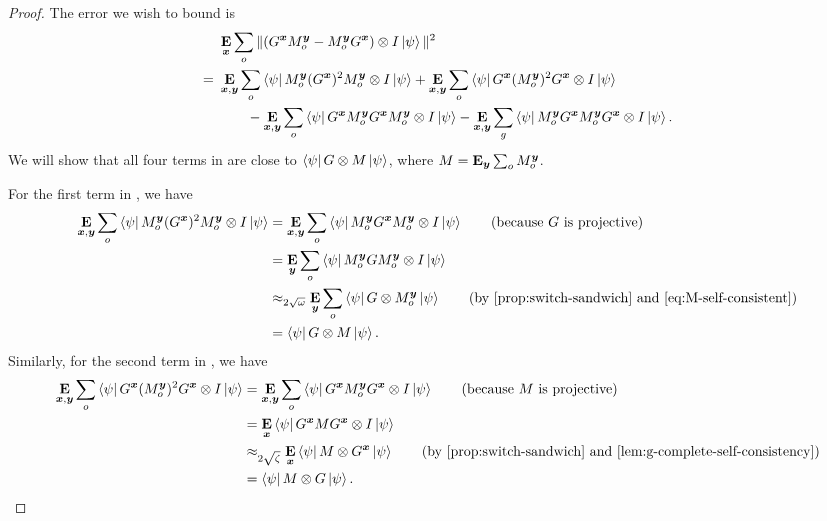 \begin{proof}
The error we wish to bound is
\begin{align}
&\mathop{\bf E\/}_{{\boldsymbol{x}}} \sum_o \Vert (G^{{\boldsymbol{x}}} M^{\boldsymbol{y}}_o - M^{\boldsymbol{y}}_o G^{{\boldsymbol{x}}}) \otimes I \ket{\psi}\Vert^2\nonumber\\
=~&\mathop{\bf E\/}_{{\boldsymbol{x}}, \boldsymbol{y}} \sum_o \bra{\psi} M^{\boldsymbol{y}}_o (G^{{\boldsymbol{x}}})^2 M^{\boldsymbol{y}}_o \otimes I \ket{\psi} + \mathop{\bf E\/}_{{\boldsymbol{x}}, \boldsymbol{y}} \sum_o \bra{\psi} G^{{\boldsymbol{x}}} (M^{\boldsymbol{y}}_o)^2 G^{{\boldsymbol{x}}} \otimes I \ket{\psi}\nonumber\\
& \qquad - \mathop{\bf E\/}_{{\boldsymbol{x}}, \boldsymbol{y}} \sum_o  \bra{\psi} G^{{\boldsymbol{x}}} M^{\boldsymbol{y}}_o
        G^{{\boldsymbol{x}}} M^{\boldsymbol{y}}_o \otimes I \ket{\psi}
        	- \mathop{\bf E\/}_{{\boldsymbol{x}}, \boldsymbol{y}} \sum_g \bra{\psi}
        M^{\boldsymbol{y}}_o G^{{\boldsymbol{x}}} M^{\boldsymbol{y}}_o G^{{\boldsymbol{x}}} \otimes I \ket{\psi}.\label{eq:g-commute-with-gg-error}
\end{align}
We will show that all four terms in  are close to $\bra{\psi} G \otimes M \ket{\psi}$,
where $M = \mathop{\bf E\/}_{\boldsymbol{y}} \sum_o M^{\boldsymbol{y}}_o$.

For the first term in , we have
\begin{align*}
\E_{\bx, \by} \sum_o \bra{\psi} M^{\by}_o (G^{\bx})^2 M^{\by}_o\ot I \ket{\psi}
&= \E_{\bx, \by} \sum_o \bra{\psi} M^{\by}_o G^{\bx} M^{\by}_o\ot I \ket{\psi} \tag{because~$G$ is projective}\\
&= \E_{\by}\sum_o \bra{\psi} M^{\by}_o G M^{\by}_o \ot I \ket{\psi}\\
&\approx_{2\sqrt{\omega}} \E_{\by}\sum_o \bra{\psi} G \ot M^{\by}_o  \ket{\psi} \tag{by \Cref{prop:switch-sandwich} and \Cref{eq:M-self-consistent}}\\
&= \bra{\psi} G \ot M \ket{\psi}.
\end{align*}
Similarly, for the second term in , we have
\begin{align*}
\E_{\bx, \by} \sum_o \bra{\psi} G^{\bx} (M^{\by}_o)^2 G^{\bx} \otimes I \ket{\psi}
&=\E_{\bx, \by} \sum_o \bra{\psi} G^{\bx} M^{\by}_o G^{\bx} \otimes I \ket{\psi} \tag{because~$M$ is projective}\\
&=\E_{\bx}  \bra{\psi} G^{\bx} M G^{\bx} \otimes I \ket{\psi}\\
&\approx_{2\sqrt{\zeta}} \E_{\bx} \bra{\psi} M \ot G^{\bx}  \ket{\psi} \tag{by \Cref{prop:switch-sandwich} and \Cref{lem:g-complete-self-consistency}}\\
&= \bra{\psi} M \ot G \ket{\psi}.
\end{align*}


\end{proof}
